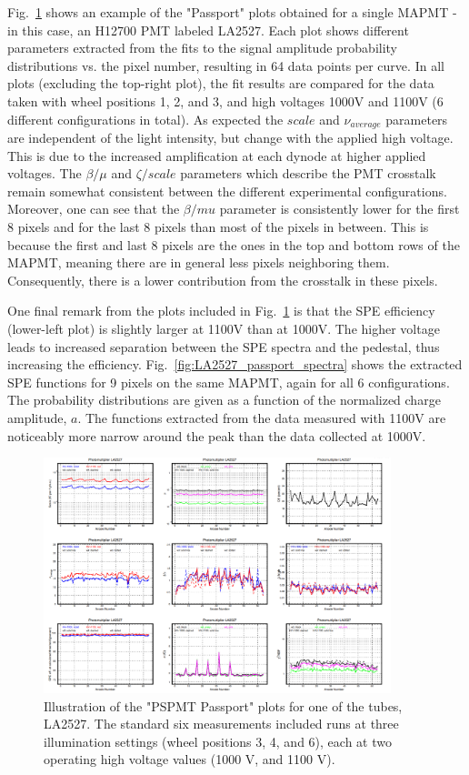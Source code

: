 Fig.~\ref{fig:LA2527_passport} shows an example of the "Passport" plots obtained for a single MAPMT - in this case, an H12700 PMT labeled LA2527. 
Each plot shows different parameters extracted from the fits to the signal amplitude probability distributions vs. the pixel number, resulting in 64 data points per curve.
In all plots (excluding the top-right plot), the fit results are compared for the data taken with wheel positions 1, 2, and 3, and high voltages 1000V and 1100V (6 different configurations in total).
As expected the $scale$ and $\nu_{average}$ parameters are independent of the light intensity, but change with the applied high voltage. 
This is due to the increased amplification at each dynode at higher applied voltages.
The $\beta/\mu$ and $\zeta/scale$ parameters which describe the PMT crosstalk remain somewhat consistent between the different experimental configurations. 
Moreover, one can see that the $\beta/mu$ parameter is consistently lower for the first 8 pixels and for the last 8 pixels than most of the pixels in between.
This is because the first and last 8 pixels are the ones in the top and bottom rows of the MAPMT, meaning there are in general less pixels neighboring them.
Consequently, there is a lower contribution from the crosstalk in these pixels.

One final remark from the plots included in Fig.~\ref{fig:LA2527_passport} is that the SPE efficiency (lower-left plot) is slightly larger at 1100V than at 1000V. The higher voltage leads to increased separation between the SPE spectra and the pedestal, thus increasing the efficiency. 
Fig.~\ref{fig:LA2527_passport_spectra} shows the extracted SPE functions for 9 pixels on the same MAPMT, again for all 6 configurations. The probability distributions are given as a function of the normalized charge amplitude, $a$. The functions extracted from the data measured with 1100V are noticeably more narrow around the peak than the data collected at 1000V.

\begin{figure}[h!bt]
	\centering
	\includegraphics[width=0.9\textwidth]{figures/pavel_temp/LA2527_passport_temp.png}
	\caption{Illustration of the "PSPMT Passport" plots for one of the tubes, LA2527. The standard six measurements included runs at three illumination settings (wheel positions 3, 4, and 6), each at two operating high voltage values (1000 V, and 1100 V).}
	\label{fig:LA2527_passport}
\end{figure}


